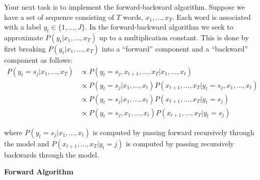 \documentclass{article}
\begin{document}
Your next task is to implement the forward-backward algorithm. Suppose we have a set of sequence consisting of $T$ words, $x_1,...,x_T$. Each word is associated with a label $y_t\in\{1,...,J\}$. In the forward-backward algorithm we seek to approximate $P(y_t | x_1,...,x_T)$ up to a multiplication constant. This is done by first breaking $P(y_t | x_1,...,x_T)$ into a ``forward'' component and a ``backward'' component as follows:
\begin{align*}
   P(y_t =s_j | x_1,...,x_T) &\propto P(y_t=s_j,x_{t+1},...,x_T|x_1,...,x_{t})\\
   &\propto P(y_t=s_j|x_1,...,x_{t})P(x_{t+1},...,x_T|y_t=s_j, x_1,...,x_{t})\\
    &\propto P(y_t=s_j|x_1,...,x_{t})P(x_{t+1},...,x_T|y_t=s_j)\\ 
     &\propto P(y_t=s_j, x_1,...,x_{t})P(x_{t+1},...,x_T|y_t=s_j) 
\end{align*}


where $P(y_t=s_j|x_1,...,x_{t})$ is computed by passing forward recursively through the model and $P(x_{t+1},...,x_T|y_t=j)$ is computed by passing recursively backwards through the model.

\textbf{Forward Algorithm}
\end{document}

